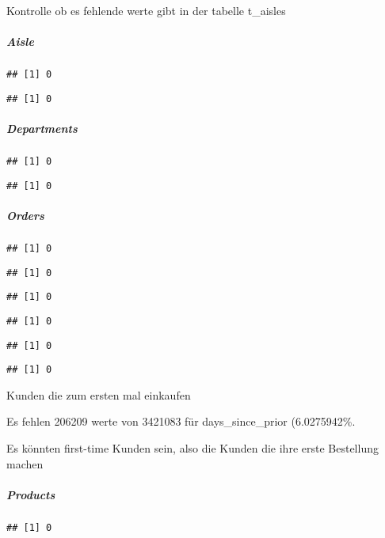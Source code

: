 \documentclass[]{article}
\let\oldsubparagraph\subparagraph
\renewcommand{\subparagraph}[1]{\oldsubparagraph{#1}\mbox{}}
\begin{document}
Kontrolle ob es fehlende werte gibt in der tabelle t\_aisles

\hypertarget{aisle}{%
\subparagraph{Aisle}\label{aisle}}

\begin{verbatim}
## [1] 0
\end{verbatim}

\begin{verbatim}
## [1] 0
\end{verbatim}

\hypertarget{departments}{%
\subparagraph{Departments}\label{departments}}

\begin{verbatim}
## [1] 0
\end{verbatim}

\begin{verbatim}
## [1] 0
\end{verbatim}

\hypertarget{orders}{%
\subparagraph{Orders}\label{orders}}

\begin{verbatim}
## [1] 0
\end{verbatim}

\begin{verbatim}
## [1] 0
\end{verbatim}

\begin{verbatim}
## [1] 0
\end{verbatim}

\begin{verbatim}
## [1] 0
\end{verbatim}

\begin{verbatim}
## [1] 0
\end{verbatim}

\begin{verbatim}
## [1] 0
\end{verbatim}

Kunden die zum ersten mal einkaufen

Es fehlen 206209 werte von 3421083 für days\_since\_prior (6.0275942\%.

Es könnten first-time Kunden sein, also die Kunden die ihre erste
Bestellung machen

\hypertarget{products}{%
\subparagraph{Products}\label{products}}

\begin{verbatim}
## [1] 0
\end{verbatim}
\end{document}
